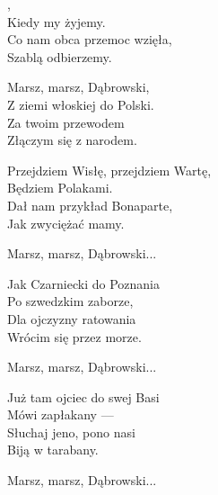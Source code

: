 \documentclass[12pt,a4paper,twoside]{songbook}
\begin{document}
  \begin{lyrics}
    ,\\
    Kiedy my żyjemy.\\
    Co nam obca przemoc wzięła,\\
    Szablą odbierzemy.

    Marsz, marsz, Dąbrowski,\\
    Z ziemi włoskiej do Polski.\\
    Za twoim przewodem\\
    Złączym się z narodem.

    Przejdziem Wisłę, przejdziem Wartę,\\
    Będziem Polakami.\\
    Dał nam przykład Bonaparte,\\
    Jak zwyciężać mamy.
      
    Marsz, marsz, Dąbrowski...

    Jak Czarniecki do Poznania\\
    Po szwedzkim zaborze,\\
    Dla ojczyzny ratowania\\
    Wrócim się przez morze.
    
    Marsz, marsz, Dąbrowski...

    Już tam ojciec do swej Basi\\
    Mówi zapłakany —\\
    Słuchaj jeno, pono nasi\\
    Biją w tarabany.

    Marsz, marsz, Dąbrowski...
  \end{lyrics}


  \begin{info}
    \lipsum
  \end{info}
\end{document}

